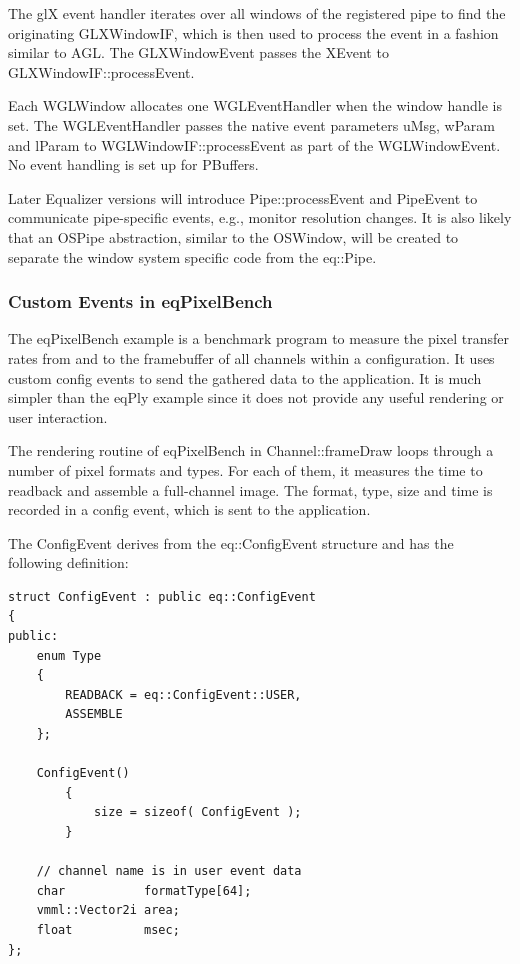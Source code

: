 \documentclass[10pt,a4]{scrartcl}
\begin{document}
The glX event handler iterates over all windows of the registered pipe
to find the originating \textsf{GLXWindowIF}, which is then used to
process the event in a fashion similar to AGL. The
\textsf{GLXWindowEvent} passes the \textsf{XEvent} to
\textsf{GLXWindowIF::\-process\-Event}.

Each \textsf{WGLWindow} allocates one \textsf{WGLEventHandler} when the
window handle is set. The WGLEventHandler passes the native event
parameters \textsf{uMsg}, \textsf{wParam} and \textsf{lParam} to
\textsf{WGL\-Win\-dowIF::processEvent} as part of the
\textsf{WGLWindowEvent}. No event handling is set up for PBuffers.

Later Equalizer versions will introduce \textsf{Pipe::pro\-cess\-Event} and
\textsf{PipeEvent} to communicate pipe-specific events, e.g., monitor
resolution changes. It is also likely that an \textsf{OSPipe}
abstraction, similar to the \textsf{OSWindow}, will be created to
separate the window system specific code from the \textsf{eq::Pipe}.


\subsubsection{Custom Events in eqPixelBench}

The \textsf{eqPixelBench} example is a benchmark program to measure the
pixel transfer rates from and to the framebuffer of all channels within
a configuration. It uses custom config events to send the gathered data
to the application. It is much simpler than the \textsf{eqPly} example
since it does not provide any useful rendering or user interaction.

The rendering routine of \textsf{eqPixelBench} in
\textsf{Channel::frameDraw} loops through a number of pixel formats and
types. For each of them, it measures the time to readback and assemble a
full-channel image. The format, type, size and time is recorded in a
config event, which is sent to the application.

The \textsf{ConfigEvent} derives from the \textsf{eq::ConfigEvent}
structure and has the following definition:

{\footnotesize\begin{lstlisting}
struct ConfigEvent : public eq::ConfigEvent
{
public:
    enum Type
    {
        READBACK = eq::ConfigEvent::USER,
        ASSEMBLE
    };

    ConfigEvent()
        {
            size = sizeof( ConfigEvent );
        }

    // channel name is in user event data
    char           formatType[64];
    vmml::Vector2i area;
    float          msec;
};
\end{lstlisting}}
\end{document}
